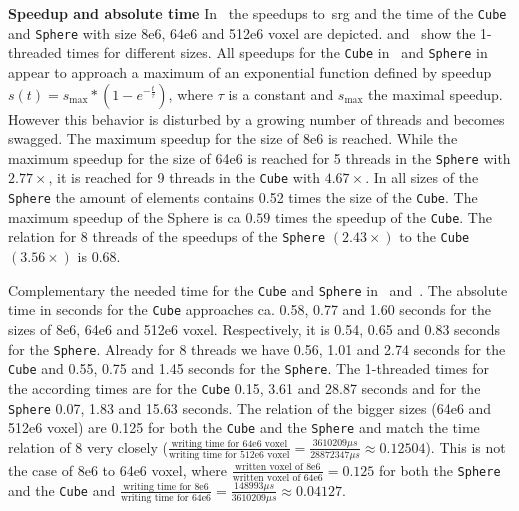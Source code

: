 \documentclass{article}
\begin{document}
\textbf{Speedup and absolute time}
In~ the speedups to~\ac{srg} and the time of the \texttt{Cube} and \texttt{Sphere} with size 8e6, 64e6 and 512e6 voxel are depicted.
 and~ show the 1-threaded times for different sizes.
All speedups for the \texttt{Cube} in~ and \texttt{Sphere} in~ appear to approach a maximum of an exponential function defined by speedup $s(t)=s_{\text{max}} * (1-e^{-\frac{t}{\tau}})$, where $\tau$ is a constant and $s_\text{max}$ the maximal speedup.
However this behavior is disturbed by a growing number of threads and becomes swagged.
The maximum speedup for the size of 8e6 is reached.
While the maximum speedup for the size of 64e6 is reached for 5 threads in the \texttt{Sphere} with $2.77\times $, it is reached for 9 threads in the \texttt{Cube} with $4.67\times $.
In all sizes of the \texttt{Sphere} the amount of elements contains 0.52 times the size of the \texttt{Cube}. 
The maximum speedup of the Sphere is ca $0.59$ times the speedup of the \texttt{Cube}.
The relation for 8 threads of the speedups of the \texttt{Sphere} $(2.43\times )$ to the \texttt{Cube} $(3.56\times )$ is $0.68$.\par
Complementary the needed time for the \texttt{Cube} and \texttt{Sphere} in~ and~.
The absolute time in seconds for the \texttt{Cube} approaches ca. 0.58, 0.77 and 1.60 seconds for the sizes of 8e6, 64e6 and 512e6 voxel.
Respectively, it is 0.54, 0.65 and 0.83 seconds for the \texttt{Sphere}.
Already for 8 threads we have 0.56, 1.01 and 2.74 seconds for the \texttt{Cube} and 0.55, 0.75 and 1.45 seconds for the \texttt{Sphere}.
The 1-threaded times for the according times are for the \texttt{Cube} 0.15, 3.61 and 28.87 seconds and for the \texttt{Sphere} 0.07, 1.83 and 15.63 seconds.
The relation of the bigger sizes (64e6 and 512e6 voxel) are 0.125 for both the \texttt{Cube} and the \texttt{Sphere} and match the time relation of 8 very closely ($\frac{\text{writing time for 64e6 voxel}}{\text{writing time for 512e6 voxel}} = \frac{3610209\mu s}{28872347\mu s} \approx 0.12504$).
This is not the case of 8e6 to 64e6 voxel, where
$\frac{\text{written voxel of 8e6}}{\text{written voxel of 64e6}} = 0.125$
for both the \texttt{Sphere} and the \texttt{Cube} and
$\frac{\text{writing time for 8e6}}{\text{writing time for 64e6}} = \frac{148993\mu s}{3610209\mu s}\approx 0.04127$.
\end{document}
